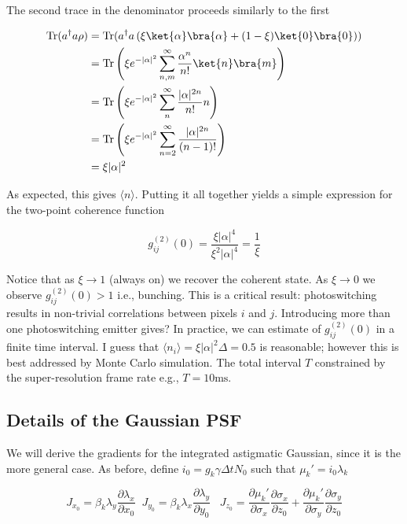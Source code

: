 The second trace in the denominator proceeds similarly to the first

\begin{align*}
\mathrm{Tr}(a^{\dagger}a\rho) &= \mathrm{Tr}(a^{\dagger}a \left(\xi\ket{\alpha}\bra{\alpha} + (1-\xi)\ket{0}\bra{0}\right))\\
&= \mathrm{Tr}\left(\xi e^{-|\alpha|^{2}}\sum_{n,m}^{\infty}\frac{\alpha^{n}}{n!}\ket{n}\bra{m} \right)\\
&= \mathrm{Tr}\left(\xi e^{-|\alpha|^{2}}\sum_{n}^{\infty}\frac{|\alpha|^{2n}}{n!}n\right)\\
&= \mathrm{Tr}\left(\xi e^{-|\alpha|^{2}}\sum_{n=2}^{\infty}\frac{|\alpha|^{2n}}{(n-1)!}\right)\\
&= \xi|\alpha|^{2}
\end{align*}

As expected, this gives $\langle n\rangle$. Putting it all together yields a simple expression for the two-point coherence function

\begin{equation*}
g^{(2)}_{ij}(0) = \frac{\xi|\alpha|^{4}}{\xi^{2}|\alpha|^{4}} = \frac{1}{\xi}
\end{equation*}

Notice that as $\xi\rightarrow 1$ (always on) we recover the coherent state. As $\xi\rightarrow 0$ we observe $g^{(2)}_{ij}(0) > 1$ i.e., bunching. This is a critical result: photoswitching results in non-trivial correlations between pixels $i$ and $j$. Introducing more than one photoswitching emitter gives? In practice, we can estimate of $g^{(2)}_{ij}(0)$ in a finite time interval. I guess that $\langle n_{i}\rangle = \xi |\alpha|^{2}\Delta = 0.5$ is reasonable; however this is best addressed by Monte Carlo simulation. The total interval $T$ constrained by the super-resolution frame rate e.g., $T=10\mathrm{ms}$. 



\subsection{Details of the Gaussian PSF}

We will derive the gradients for the integrated astigmatic Gaussian, since it is the more general case. As before, define $i_{0} = g_{k}\gamma\Delta t N_{0}$ such that $\mu_{k}' = i_{0}\lambda_{k}$

\begin{equation*}
J_{x_{0}} = \beta_{k}\lambda_{y}\frac{\partial \lambda_{x}}{\partial x_{0}} \;\; J_{y_{0}} = \beta_{k}\lambda_{x}\frac{\partial \lambda_{y}}{\partial y_{0}}\;\;\; J_{z_{0}}  = \frac{\partial \mu_{k}'}{\partial \sigma_{x}}\frac{\partial \sigma_{x}}{\partial z_{0}} + \frac{\partial \mu_{k}'}{\partial \sigma_{y}}\frac{\partial \sigma_{y}}{\partial z_{0}}
\end{equation*}

